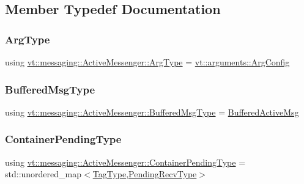 \subsection{Member Typedef Documentation}
\mbox{\label{structvt_1_1messaging_1_1_active_messenger_a62cdeb842610617f316e6b20c19c5031}} 
\subsubsection{\texorpdfstring{Arg\+Type}{ArgType}}
{\footnotesize\ttfamily using \hyperlink{structvt_1_1messaging_1_1_active_messenger_a62cdeb842610617f316e6b20c19c5031}{vt\+::messaging\+::\+Active\+Messenger\+::\+Arg\+Type} =  \hyperlink{structvt_1_1arguments_1_1_arg_config}{vt\+::arguments\+::\+Arg\+Config}}

\mbox{\label{structvt_1_1messaging_1_1_active_messenger_a80a9cbda399d7bf035bfcecc761f4b02}} 
\subsubsection{\texorpdfstring{Buffered\+Msg\+Type}{BufferedMsgType}}
{\footnotesize\ttfamily using \hyperlink{structvt_1_1messaging_1_1_active_messenger_a80a9cbda399d7bf035bfcecc761f4b02}{vt\+::messaging\+::\+Active\+Messenger\+::\+Buffered\+Msg\+Type} =  \hyperlink{structvt_1_1messaging_1_1_buffered_active_msg}{Buffered\+Active\+Msg}}

\mbox{\label{structvt_1_1messaging_1_1_active_messenger_a388e97eeb72592e57551e045b43bcfde}} 
\subsubsection{\texorpdfstring{Container\+Pending\+Type}{ContainerPendingType}}
{\footnotesize\ttfamily using \hyperlink{structvt_1_1messaging_1_1_active_messenger_a388e97eeb72592e57551e045b43bcfde}{vt\+::messaging\+::\+Active\+Messenger\+::\+Container\+Pending\+Type} =  std\+::unordered\+\_\+map$<$\hyperlink{namespacevt_a84ab281dae04a52a4b243d6bf62d0e52}{Tag\+Type},\hyperlink{structvt_1_1messaging_1_1_active_messenger_add1d7ab7bf168d53dfe7b93f29f64f02}{Pending\+Recv\+Type}$>$}

